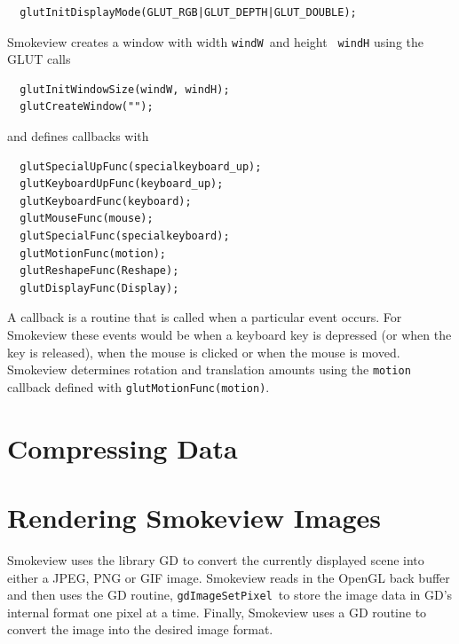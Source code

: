 \documentclass[11pt,twoside]{book}
\begin{document}
\begin{verbatim}
  glutInitDisplayMode(GLUT_RGB|GLUT_DEPTH|GLUT_DOUBLE);
\end{verbatim}

Smokeview creates a window with width {\tt windW}\ and height {\tt
windH} using the GLUT calls

\begin{verbatim}
  glutInitWindowSize(windW, windH);
  glutCreateWindow("");
\end{verbatim}

and defines callbacks with

\begin{verbatim}
  glutSpecialUpFunc(specialkeyboard_up);
  glutKeyboardUpFunc(keyboard_up);
  glutKeyboardFunc(keyboard);
  glutMouseFunc(mouse);
  glutSpecialFunc(specialkeyboard);
  glutMotionFunc(motion);
  glutReshapeFunc(Reshape);
  glutDisplayFunc(Display);
\end{verbatim}

A callback is a routine that is called when a particular event
occurs.  For Smokeview these events would be when a keyboard key
is depressed (or when the key is released), when the mouse is
clicked or when the mouse is moved.  Smokeview determines rotation
and translation amounts using the {\tt motion} callback defined
with {\tt glutMotionFunc(motion)}.

\chapter{Compressing Data}
\chapter{Rendering Smokeview Images}

Smokeview uses the library GD\cite{GDLIB} to convert the currently displayed scene into either a JPEG, PNG or GIF image.  Smokeview reads in the OpenGL back buffer and then uses the GD routine, {\tt gdImageSetPixel}\ to store the image data in GD's internal format one pixel at a time.    Finally, Smokeview uses a GD routine to convert the image into the desired image format.
\end{document}
